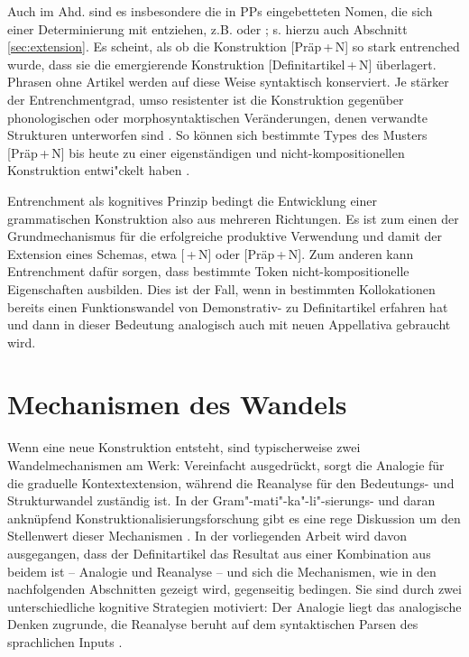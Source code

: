 Auch im Ahd. sind es insbesondere die in PPs eingebetteten Nomen, die sich einer Determinierung mit  entziehen, z.B.   oder   \parencite[84]{Oubouzar1992}; s. hierzu auch Abschnitt \ref{sec:extension}. Es scheint, als ob die Konstruktion [Präp\,+\,N] so stark entrenched wurde, dass sie die emergierende Konstruktion [Definitartikel\,+\,N] überlagert. Phrasen ohne Artikel werden auf diese Weise syntaktisch konserviert. Je stärker der Entrenchmentgrad, umso resistenter ist die Konstruktion gegenüber phonologischen oder morphosyntaktischen Veränderungen, denen verwandte Strukturen unterworfen sind \parencite[715]{Bybee2006}. So können sich bestimmte Types des Musters [Präp\,+\,N] bis heute zu einer eigenständigen und nicht-kompositionellen Konstruktion entwi"ckelt haben \parencite[343--344]{Himmelmann1998}. 

Entrenchment als kognitives Prinzip bedingt die Entwicklung einer grammatischen Konstruktion also aus mehreren Richtungen. Es ist zum einen der Grundmechanismus für die erfolgreiche produktive Verwendung und damit der Extension eines Schemas, etwa [\,+\,N] oder [Präp\,+\,N]. Zum anderen kann Entrenchment dafür sorgen, dass bestimmte Token nicht-kompositionelle Eigenschaften ausbilden. Dies ist der Fall, wenn  in bestimmten Kollokationen bereits einen Funktionswandel von Demonstrativ- zu Definitartikel erfahren hat und dann in dieser Bedeutung analogisch auch mit neuen Appellativa gebraucht wird. 


\section{Mechanismen des Wandels}\label{sec:mechanismen}

Wenn eine neue Konstruktion entsteht, sind typischerweise zwei Wandelmechanismen am Werk: Vereinfacht ausgedrückt, sorgt die Analogie für die graduelle Kontextextension, während die Reanalyse für den Bedeutungs- und Strukturwandel zuständig ist. In der Gram"-mati"-ka"-li"-sierungs- und daran anknüpfend  Konstruktionalisierungsforschung gibt es eine rege Diskussion um den Stellenwert dieser Mechanismen \parencite[vgl. u.a.][]{Haspelmath1998,Lehmann2004,Fischer2007}. In der vorliegenden Arbeit wird davon ausgegangen, dass der Definitartikel das Resultat aus einer Kombination aus beidem ist --  Analogie und Reanalyse -- und sich die Mechanismen, wie in den nachfolgenden Abschnitten gezeigt wird, gegenseitig bedingen. Sie sind durch zwei unterschiedliche kognitive Strategien motiviert: Der Analogie liegt das analogische Denken zugrunde, die Reanalyse beruht auf dem syntaktischen Parsen des sprachlichen Inputs \parencite[38]{Traugott2013}.  


